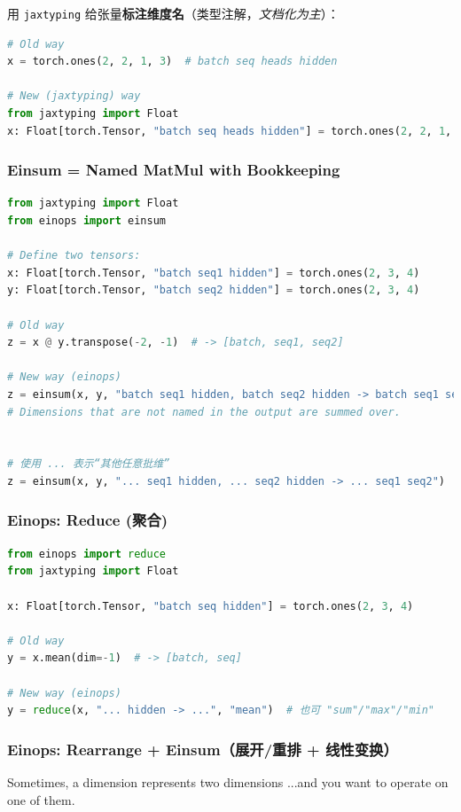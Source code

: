 用 \texttt{jaxtyping} 给张量\textbf{标注维度名}（类型注解，\emph{文档化为主}）：
\begin{lstlisting}[language=Python]
# Old way
x = torch.ones(2, 2, 1, 3)  # batch seq heads hidden

# New (jaxtyping) way
from jaxtyping import Float
x: Float[torch.Tensor, "batch seq heads hidden"] = torch.ones(2, 2, 1, 3)
\end{lstlisting}

\subsubsection{Einsum = Named MatMul with Bookkeeping}

\begin{lstlisting}[language=Python]
from jaxtyping import Float
from einops import einsum

# Define two tensors:
x: Float[torch.Tensor, "batch seq1 hidden"] = torch.ones(2, 3, 4)
y: Float[torch.Tensor, "batch seq2 hidden"] = torch.ones(2, 3, 4)

# Old way
z = x @ y.transpose(-2, -1)  # -> [batch, seq1, seq2]

# New way (einops)
z = einsum(x, y, "batch seq1 hidden, batch seq2 hidden -> batch seq1 seq2")
# Dimensions that are not named in the output are summed over.


# 使用 ... 表示“其他任意批维”
z = einsum(x, y, "... seq1 hidden, ... seq2 hidden -> ... seq1 seq2")
\end{lstlisting}

\clearpage
\subsubsection{Einops: Reduce (聚合)}

\begin{lstlisting}[language=Python]
from einops import reduce
from jaxtyping import Float

x: Float[torch.Tensor, "batch seq hidden"] = torch.ones(2, 3, 4)

# Old way
y = x.mean(dim=-1)  # -> [batch, seq]

# New way (einops)
y = reduce(x, "... hidden -> ...", "mean")  # 也可 "sum"/"max"/"min"
\end{lstlisting}

\subsubsection{Einops: Rearrange + Einsum（展开/重排 + 线性变换）}
Sometimes, a dimension represents two dimensions
...and you want to operate on one of them.

